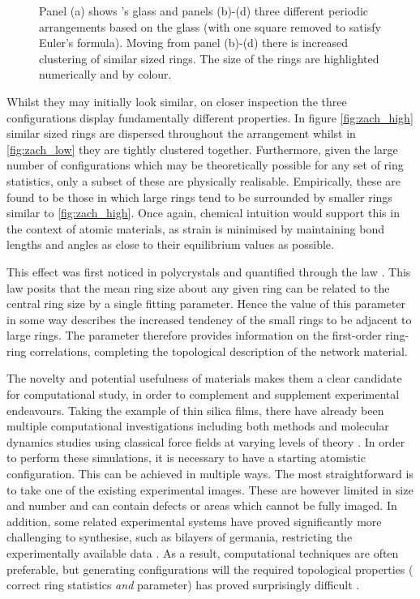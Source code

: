 \begin{figure}[h]
     \caption{Panel (a) shows \zach's glass and panels (b)\--(d) three different periodic arrangements based on the glass (with one square removed to satisfy Euler's formula). Moving from panel (b)\--(d) there is increased clustering of similar sized rings. The size of the rings are highlighted numerically and by colour.}
     \label{fig:zach}
\end{figure}

Whilst they may initially look similar, on closer inspection the three configurations display fundamentally different properties.
In figure \ref{fig:zach_high} similar sized rings are dispersed throughout the arrangement whilst in \ref{fig:zach_low} they are tightly clustered together.
Furthermore, given the large number of configurations which may be theoretically possible for any set of ring statistics, only a subset of these are physically realisable.
Empirically, these are found to be those in which large rings tend to be surrounded by smaller rings \ie{} similar to \ref{fig:zach_high}.
Once again, chemical intuition would support this in the context of atomic materials, as strain is minimised by maintaining bond lengths and angles as close to their equilibrium values as possible.

This effect was first noticed in polycrystals and quantified through the \aw{} law \cite{Aboav1970,Weaire1974}.
This law posits that the mean ring size about any given ring can be related to the central ring size by a single fitting parameter.
Hence the value of this parameter in some way describes the increased tendency of the small rings to be adjacent to large rings.
The \aw{} parameter therefore provides information on the first\--order ring\--ring correlations, completing the topological description of the network material.

The novelty and potential usefulness of \td{} materials makes them a  clear candidate for computational study, in order to complement and supplement experimental endeavours. 
Taking the example of thin silica films, there have already been multiple computational investigations including both \abinitio{} methods and molecular dynamics studies using classical force fields at varying levels of theory \cite{Bjorkman2013,Malashevich2016,Wilson2013,Wilson2018,Zhang2018a,Bamer2019,Roy2019,Richter2019}.
In order to perform these simulations, it is necessary to have a starting atomistic configuration.
This can be achieved in multiple ways. 
The most straightforward is to take one of the existing experimental images. 
These are however limited in size and number and can contain defects or areas which cannot be fully imaged.
In addition, some related experimental systems have proved significantly more challenging to synthesise, such as bilayers of germania, restricting the experimentally available data  \cite{Lewandowski2018,Lewandowski2019}.
As a result, computational techniques are often preferable, but generating configurations will the required topological properties (\ie{} correct ring statistics \textit{and} \aw{} parameter) has proved surprisingly difficult \cite{Roy2018,Kumar2014}.

